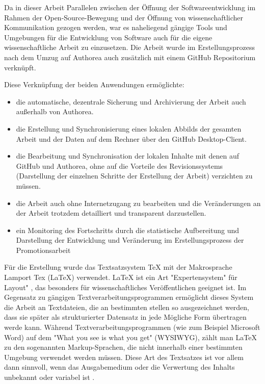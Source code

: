 Da in dieser Arbeit Parallelen zwischen der Öffnung der Softwareentwicklung im Rahmen der Open-Source-Bewegung und der Öffnung von wissenschaftlicher Kommunikation gezogen werden, war es naheliegend gängige Tools und Umgebungen für die Entwicklung von Software auch für die eigene wissenschaftliche Arbeit zu einzusetzen. Die Arbeit wurde im Erstellungsprozess nach dem Umzug auf Authorea auch zusätzlich mit einem GitHub Repositorium verknüpft.

Diese Verknüpfung der beiden Anwendungen ermöglichte:
\begin{itemize}
\item die automatische, dezentrale Sicherung und Archivierung der Arbeit auch außerhalb von Authorea.
\item die Erstellung und Synchronisierung eines lokalen Abbilds der gesamten Arbeit und der Daten auf dem Rechner über den GitHub Desktop-Client.
\item die Bearbeitung und Synchronisation der lokalen Inhalte mit denen auf GitHub und Authorea, ohne auf die Vorteile des Revisionssystems (Darstellung der einzelnen Schritte der Erstellung der Arbeit) verzichten zu müssen.
\item die Arbeit auch ohne Internetzugang zu bearbeiten und die Veränderungen an der Arbeit trotzdem detailliert und transparent darzustellen.
\item ein Monitoring des Fortschritts durch die statistische Aufbereitung und Darstellung der Entwicklung und Veränderung im Erstellungsprozess der Promotionsarbeit
\end{itemize}

Für die Erstellung wurde das Textsatzsystem TeX mit der Makrosprache Lamport Tex (LaTeX) verwendet. LaTeX ist ein Art "Expertensystem" für Layout" \cite{suchen}, das besonders für wissenschaftliches Veröffentlichen geeignet ist. Im Gegensatz zu gängigen Textverarbeitungsprogrammen ermöglicht dieses System die Arbeit an Textdateien, die an bestimmten stellen so ausgezeichnet werden, dass sie später als strukturierter Datensatz in jede Mögliche Form übertragen werde kann. Während Textverarbeitungsprogrammen (wie zum Beispiel Microsoft Word) auf dem "What you see is what you get" (WYSIWYG), zählt man LaTeX zu den sogenannten Markup-­Sprachen, die nicht innerhalb einer bestimmten Umgebung verwendet werden müssen. Diese Art des Textsatzes ist vor allem dann sinnvoll, wenn das Ausgabemedium oder die Verwertung des Inhalts unbekannt oder variabel ist \cite{suchen}.

